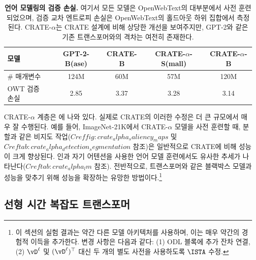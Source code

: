 \documentclass[../../book-main_ko.tex]{subfiles}
\begin{document}
\begin{table}
    \centering
    \begin{tabular}{@{}lcccc@{}}
    \toprule
    모델 & GPT-2-B(ase) & CRATE-B & CRATE-\( \alpha \)-S(mall) & CRATE-\( \alpha \)-B \\
    \midrule
    \midrule
    \# 매개변수 & 124M & 60M & 57M & 120M \\
    OWT 검증 손실 & 2.85 & 3.37 & 3.28 & 3.14 \\
    \bottomrule
    \end{tabular}
    \caption{\small\textbf{언어 모델링의 검증 손실.} 여기서 모든 모델은 OpenWebText의 대부분에서 사전 훈련되었으며, 검증 교차 엔트로피 손실은 OpenWebText의 홀드아웃 하위 집합에서 측정된다. CRATE-\( \alpha \)는 CRATE 설계에 비해 상당한 개선을 보여주지만, GPT-2와 같은 기존 트랜스포머와의 격차는 여전히 존재한다.}
    \label{tab:crate_alpha_lm}
\end{table}

CRATE-\( \alpha \) 계층은 에 나와 있다. 실제로 CRATE의 이러한 수정은 더 큰 규모에서 매우 잘 수행된다. 예를 들어, ImageNet-21K에서 CRATE-\( \alpha \) 모델을 사전 훈련할 때, 분할과 같은 비지도 작업(\(Cref{fig:crate_alpha_saliency_maps}\) 및 \(Cref{tab:crate_alpha_detection_segmentation}\) 참조)은 일반적으로 CRATE에 비해 성능이 크게 향상된다. 인과 자기 어텐션을 사용한 언어 모델 훈련에서도 유사한 추세가 나타난다(\(Cref{tab:crate_alpha_lm}\) 참조). 전반적으로, 트랜스포머와 같은 블랙박스 모델과 성능을 맞추기 위해 성능을 확장하는 유망한 방법이다.\footnote{이 섹션의 실험 결과는 약간 다른 모델 아키텍처를 사용하며, 이는 매우 약간의 경험적 이득을 추가한다. 변경 사항은 다음과 같다: (1) ODL 블록에 추가 잔차 연결, (2) \(\vD^{\ell}\) 및 \((\vD^{\ell})^{\top}\) 대신 두 개의 별도 사전을 사용하도록 \(\ISTA\) 수정.}

\subsection{선형 시간 복잡도 트랜스포머}\label{sub:tost_experiments}
\end{document}
